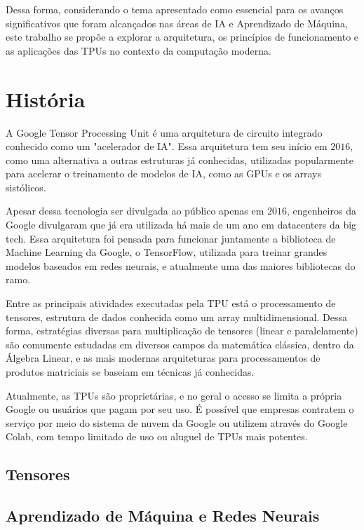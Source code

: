 \documentclass{report}
\begin{document}
Dessa forma, considerando o tema apresentado como essencial para os avanços significativos que foram alcançados nas áreas de IA e Aprendizado de Máquina, este trabalho se propõe a explorar a arquitetura, os princípios de funcionamento e as aplicações das TPUs no contexto da computação moderna. 

\chapter{História}

A Google Tensor Processing Unit é uma arquitetura de circuito integrado conhecido como um "acelerador de IA". Essa arquitetura tem seu início em $2016$, como uma alternativa a outras estruturas já conhecidas, utilizadas popularmente para acelerar o treinamento de modelos de IA, como as GPUs e os arrays sistólicos.

Apesar dessa tecnologia ser divulgada ao público apenas em $2016$, engenheiros da Google divulgaram que já era utilizada há mais de um ano em datacenters da big tech. Essa arquitetura foi pensada para funcionar juntamente a biblioteca de Machine Learning da Google, o TensorFlow, utilizada para treinar grandes modelos baseados em redes neurais, e atualmente uma das maiores bibliotecas do ramo. 

Entre as principais atividades executadas pela TPU está o processamento de tensores, estrutura de dados conhecida como um array multidimensional. Dessa forma, estratégias diversas para multiplicação de tensores (linear e paralelamente) são comumente estudadas em diversos campos da matemática clássica, dentro da Álgebra Linear, e as mais modernas arquiteturas para processamentos de produtos matriciais se baseiam em técnicas já conhecidas.

Atualmente, as TPUs são proprietárias, e no geral o acesso se limita a própria Google ou usuários que pagam por seu uso. É possível que empresas contratem o serviço por meio do sistema de nuvem da Google ou utilizem através do Google Colab, com tempo limitado de uso ou aluguel de TPUs mais potentes.

\section{Tensores}

\section{Aprendizado de Máquina e Redes Neurais}
\end{document}
